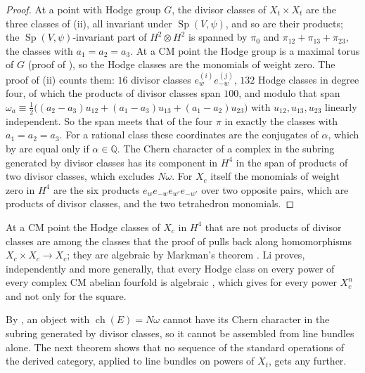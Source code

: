\documentclass[11pt,reqno]{amsart}
\theoremstyle{plain}
\theoremstyle{definition}
\theoremstyle{remark}
\newcommand{\QQ}{\mathbb{Q}}
\DeclareMathOperator{\ch}{ch}
\DeclareMathOperator{\Sp}{Sp}
\begin{document}
\begin{proof}
At a point with Hodge group $G$, the divisor classes of $X_{t}\times X_{t}$ are
the three classes of (ii), all invariant under
$\Sp(V,\psi)$, and so are their products; the $\Sp(V,\psi)$-invariant part of
$H^{2}\otimes H^{2}$ is spanned by $\pi_{0}$ and $\pi_{12}+\pi_{13}+\pi_{23}$,
the classes with $a_{1}=a_{2}=a_{3}$. At a CM point the Hodge group is a
maximal torus of $G$ (proof of ), so the Hodge classes
are the monomials of weight zero. The proof of (ii)
counts them: $16$ divisor classes $e^{(i)}_{w}e^{(j)}_{-w}$, $132$ Hodge
classes in degree four, of which the products of divisor classes span $100$,
and modulo that span
$\omega_{a}\equiv\frac12\bigl((a_{2}-a_{3})u_{12}+(a_{1}-a_{3})u_{13}
+(a_{1}-a_{2})u_{23}\bigr)$ with $u_{12},u_{13},u_{23}$ linearly independent.
So the span meets that of the four $\pi$ in exactly the classes with
$a_{1}=a_{2}=a_{3}$. For a rational class these
coordinates are the conjugates of $\alpha$, which by  are
equal only if $\alpha\in\QQ$. The Chern character of a complex in the subring
generated by divisor classes has its component in $H^{4}$ in the span of
products of two divisor classes, which excludes $N\omega$. For $X_{c}$ itself
the monomials of weight zero in $H^{4}$ are the six products
$e_{w}e_{-w}e_{w'}e_{-w'}$ over two opposite pairs, which are products of
divisor classes, and the two tetrahedron monomials.
\end{proof}

At a CM point the Hodge classes of $X_{c}$ in $H^{4}$ that are not products
of divisor classes are among the classes that the proof of
 pulls back along homomorphisms $X_{c}\times X_{c}\to
X_{c}$; they are algebraic by Markman's theorem \cite{Mar25a}. Li proves,
independently and more generally, that every Hodge class on every power of
every complex CM abelian fourfold is algebraic \cite[Theorem~1.3]{Li26}, which
gives  for every power $X_{c}^{n}$ and not only for the
square.

By , an object with $\ch(E)=N\omega$ cannot have
its Chern character in the subring generated by divisor classes, so it cannot
be assembled from line bundles alone. The next theorem shows that no sequence
of the standard operations of the derived category, applied to line bundles
on powers of $X_{t}$, gets any further.
\end{document}

